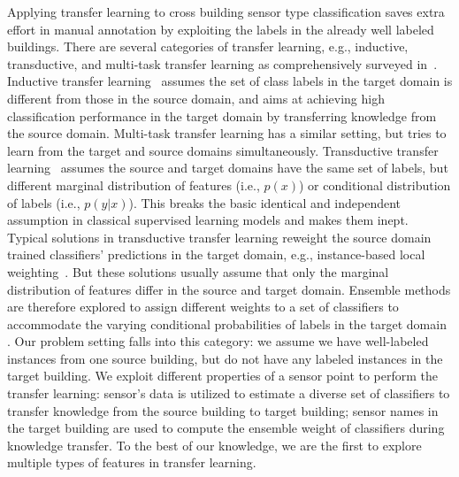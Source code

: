 Applying transfer learning to cross building sensor type classification saves
extra effort in manual annotation by exploiting the labels in the already well
labeled buildings. There are several categories of transfer learning, e.g.,
inductive, transductive, and multi-task transfer learning as comprehensively
surveyed in~\cite{transfer1}. %
Inductive transfer learning~\cite{transfer2} assumes the set of class labels in
the target domain is different from those in the source domain, and aims at
achieving high classification performance in the target domain by transferring
knowledge from the source domain. Multi-task transfer learning \cite{multitask}
has a similar setting, but tries to learn from the target and source domains
simultaneously. Transductive transfer learning~\cite{transfer3} assumes the
source and target domains have the same set of labels, but different marginal
distribution of features (i.e., $p(x)$) or conditional distribution of labels
(i.e., $p(y|x)$). This breaks the basic identical and independent assumption in
classical supervised learning models and makes them inept. Typical solutions in
transductive transfer learning reweight the source domain trained classifiers'
predictions in the target domain, e.g., instance-based local
weighting~\cite{weight1,weight2,weight3}. But these solutions usually assume
that only the marginal distribution of features differ in the source and target
domain. Ensemble methods are therefore explored to assign different weights to a
set of classifiers to accommodate the varying conditional probabilities of
labels in the target domain \cite{ensem1,ensem2}. Our problem setting falls into
this category: we assume we have well-labeled instances from one source building, but do
not have any labeled instances in the target building. We exploit different
properties of a sensor point to perform the transfer learning: sensor's  data is
utilized to estimate a diverse set of classifiers to transfer knowledge from the
source building to target building; sensor names in the target building are used
to compute the ensemble weight of classifiers during knowledge transfer. To the
best of our knowledge, we are the first to explore multiple types of features in
transfer learning.



